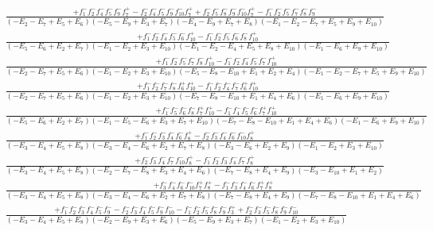 \documentclass{article}
\begin{document}
\[\begin{array}{rcl}
\frac{+f_{1}^{-}f_{2}^{-}f_{4}^{-}f_{5}^{-}f_{9}^{-}f_{7}^{+}-f_{2}^{-}f_{4}^{-}f_{5}^{-}f_{9}^{-}f_{10}^{-}f_{7}^{+}+f_{2}^{-}f_{5}^{-}f_{8}^{-}f_{9}^{-}f_{10}^{-}f_{7}^{+}-f_{1}^{-}f_{2}^{-}f_{5}^{-}f_{7}^{-}f_{8}^{-}f_{9}^{-}}{(-E_{2}-E_{7}+E_{5}+E_{6})(-E_{5}-E_{9}+E_{3}+E_{7})(-E_{4}-E_{9}+E_{7}+E_{8})(-E_{1}-E_{2}-E_{7}+E_{5}+E_{9}+E_{10})}\\
\frac{+f_{1}^{-}f_{2}^{-}f_{4}^{-}f_{5}^{-}f_{6}^{-}f_{10}^{+}-f_{1}^{-}f_{2}^{-}f_{5}^{-}f_{6}^{-}f_{8}^{-}f_{10}^{+}}{(-E_{5}-E_{6}+E_{2}+E_{7})(-E_{1}-E_{2}+E_{3}+E_{10})(-E_{1}-E_{2}-E_{4}+E_{5}+E_{8}+E_{10})(-E_{1}-E_{6}+E_{9}+E_{10})}\\
\frac{+f_{1}^{-}f_{2}^{-}f_{5}^{-}f_{7}^{-}f_{8}^{-}f_{10}^{+}-f_{1}^{-}f_{2}^{-}f_{4}^{-}f_{5}^{-}f_{7}^{-}f_{10}^{+}}{(-E_{2}-E_{7}+E_{5}+E_{6})(-E_{1}-E_{2}+E_{3}+E_{10})(-E_{5}-E_{8}-E_{10}+E_{1}+E_{2}+E_{4})(-E_{1}-E_{2}-E_{7}+E_{5}+E_{9}+E_{10})}\\
\frac{+f_{1}^{-}f_{2}^{-}f_{7}^{-}f_{8}^{-}f_{6}^{+}f_{10}^{+}-f_{1}^{-}f_{2}^{-}f_{4}^{-}f_{7}^{-}f_{6}^{+}f_{10}^{+}}{(-E_{2}-E_{7}+E_{5}+E_{6})(-E_{1}-E_{2}+E_{3}+E_{10})(-E_{7}-E_{8}-E_{10}+E_{1}+E_{4}+E_{6})(-E_{1}-E_{6}+E_{9}+E_{10})}\\
\frac{+f_{1}^{-}f_{5}^{-}f_{6}^{-}f_{8}^{-}f_{7}^{+}f_{10}^{+}-f_{1}^{-}f_{4}^{-}f_{5}^{-}f_{6}^{-}f_{7}^{+}f_{10}^{+}}{(-E_{5}-E_{6}+E_{2}+E_{7})(-E_{1}-E_{5}-E_{6}+E_{3}+E_{7}+E_{10})(-E_{7}-E_{8}-E_{10}+E_{1}+E_{4}+E_{6})(-E_{1}-E_{6}+E_{9}+E_{10})}\\
\frac{+f_{1}^{-}f_{2}^{-}f_{3}^{-}f_{4}^{-}f_{6}^{-}f_{8}^{+}-f_{2}^{-}f_{3}^{-}f_{4}^{-}f_{6}^{-}f_{10}^{-}f_{8}^{+}}{(-E_{3}-E_{4}+E_{5}+E_{8})(-E_{3}-E_{4}-E_{6}+E_{2}+E_{7}+E_{8})(-E_{3}-E_{6}+E_{2}+E_{9})(-E_{1}-E_{2}+E_{3}+E_{10})}\\
\frac{+f_{2}^{-}f_{3}^{-}f_{4}^{-}f_{7}^{-}f_{10}^{-}f_{8}^{+}-f_{1}^{-}f_{2}^{-}f_{3}^{-}f_{4}^{-}f_{7}^{-}f_{8}^{+}}{(-E_{3}-E_{4}+E_{5}+E_{8})(-E_{2}-E_{7}-E_{8}+E_{3}+E_{4}+E_{6})(-E_{7}-E_{8}+E_{4}+E_{9})(-E_{3}-E_{10}+E_{1}+E_{2})}\\
\frac{+f_{3}^{-}f_{4}^{-}f_{6}^{-}f_{10}^{-}f_{7}^{+}f_{8}^{+}-f_{1}^{-}f_{3}^{-}f_{4}^{-}f_{6}^{-}f_{7}^{+}f_{8}^{+}}{(-E_{3}-E_{4}+E_{5}+E_{8})(-E_{3}-E_{4}-E_{6}+E_{2}+E_{7}+E_{8})(-E_{7}-E_{8}+E_{4}+E_{9})(-E_{7}-E_{8}-E_{10}+E_{1}+E_{4}+E_{6})}\\
\frac{+f_{1}^{-}f_{2}^{-}f_{3}^{-}f_{4}^{-}f_{5}^{-}f_{9}^{-}-f_{2}^{-}f_{3}^{-}f_{4}^{-}f_{5}^{-}f_{9}^{-}f_{10}^{-}-f_{1}^{-}f_{2}^{-}f_{5}^{-}f_{8}^{-}f_{9}^{-}f_{3}^{+}+f_{2}^{-}f_{3}^{-}f_{5}^{-}f_{8}^{-}f_{9}^{-}f_{10}^{-}}{(-E_{3}-E_{4}+E_{5}+E_{8})(-E_{2}-E_{9}+E_{3}+E_{6})(-E_{5}-E_{9}+E_{3}+E_{7})(-E_{1}-E_{2}+E_{3}+E_{10})}\\

\end{array}\]
\end{document}
